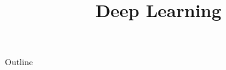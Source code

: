 \documentclass[xcolor=dvipsnames,compress,t,pdf,9pt]{beamer}
\title[\insertframenumber /\inserttotalframenumber]{Deep Learning}
\begin{document}
	\begin{frame}
	\titlepage
	\end{frame}
	
	\begin{frame}{Outline}
	    \tableofcontents
	\end{frame}

	
	
	
\end{document}
